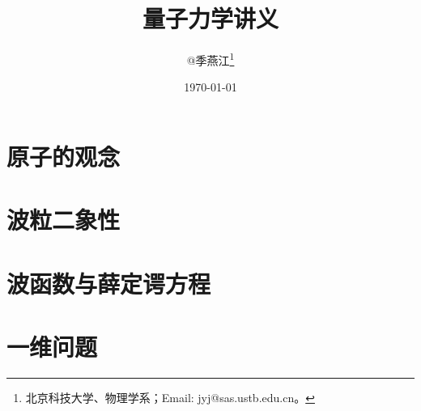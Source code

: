 \documentclass[twoside,b5paper,11pt]{book}
\begin{document}
\pagestyle{headings}


\title{量子力学讲义}
\author {@季燕江\footnote{北京科技大学、物理学系；Email: jyj@sas.ustb.edu.cn。}}




\date{\today}

\maketitle



%


%




\tableofcontents 
\setcounter{tocdepth}{2}


\newpage

\chapter{原子的观念}







\chapter{波粒二象性}









\chapter{波函数与薛定谔方程}







\chapter{一维问题}
\end{document}
